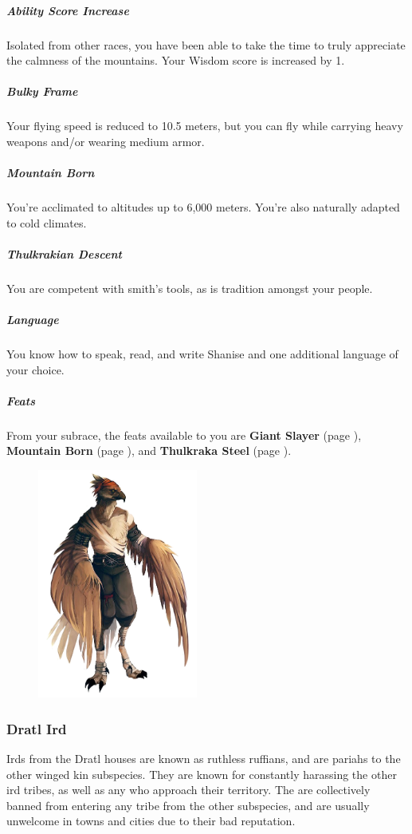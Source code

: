     \subparagraph{Ability Score Increase} Isolated from other races, you have been able to take the time to truly appreciate the calmness of the mountains.
    Your Wisdom score is increased by 1.

    \subparagraph{Bulky Frame} Your flying speed is reduced to 10.5 meters, but you can fly while carrying heavy weapons and/or wearing medium armor.

    \subparagraph{Mountain Born} You're acclimated to altitudes up to 6,000 meters.
    You're also naturally adapted to cold climates.

    \subparagraph{Thulkrakian Descent} You are competent with smith's tools, as is tradition amongst your people.

    \subparagraph{Language} You know how to speak, read, and write Shanise and one additional language of your choice.

    \subparagraph{Feats} From your subrace, the feats available to you are
    \textbf{Giant Slayer} (page \pageref{feat::giantslayer}),
    \textbf{Mountain Born} (page \pageref{feat::mountainborn}), and
    \textbf{Thulkraka Steel} (page \pageref{feat::thulkrakasteel}).

\begin{figure}[!t]
    \centering
    \includegraphics[width=0.47\textwidth]{04kins/img/12ird_thulkraka.png}
\end{figure}

\subsubsection{Dratl Ird}
    Irds from the Dratl houses are known as ruthless ruffians, and are pariahs to the other winged kin subspecies.
    They are known for constantly harassing the other ird tribes, as well as any who approach their territory.
    The are collectively banned from entering any tribe from the other subspecies, and are usually unwelcome in towns and cities due to their bad reputation.

